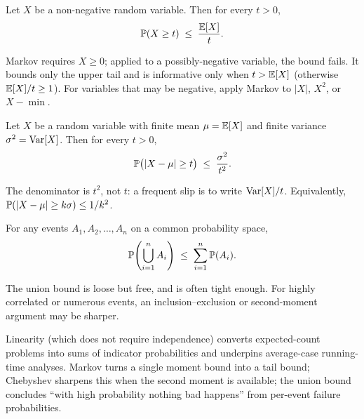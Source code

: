 \begin{theorem}
\label{thm:markov}
Let $X$ be a non-negative random variable. Then for every $t > 0$,
\[
  \operatorname{\mathbb{P}}(X \ge t) \;\le\; \frac{\operatorname{\mathbb{E}}[X]}{t}.
\]
\end{theorem}

\begin{remark}
Markov requires $X \ge 0$; applied to a possibly-negative variable, the bound fails. It bounds only the upper tail and is informative only when $t > \operatorname{\mathbb{E}}[X]$ (otherwise $\operatorname{\mathbb{E}}[X]/t \ge 1$). For variables that may be negative, apply Markov to $|X|$, $X^2$, or $X - \min$.
\end{remark}

\begin{theorem}
\label{thm:chebyshev}
Let $X$ be a random variable with finite mean $\mu = \operatorname{\mathbb{E}}[X]$ and finite variance $\sigma^2 = \operatorname{Var}[X]$. Then for every $t > 0$,
\[
  \operatorname{\mathbb{P}}\bigl(|X - \mu| \ge t\bigr) \;\le\; \frac{\sigma^2}{t^2}.
\]
\end{theorem}

\begin{remark}
The denominator is $t^2$, not $t$: a frequent slip is to write $\operatorname{Var}[X]/t$. Equivalently, $\operatorname{\mathbb{P}}(|X - \mu| \ge k\sigma) \le 1/k^2$.
\end{remark}

\begin{theorem}
\label{thm:union_bound}
For any events $A_1, A_2, \dots, A_n$ on a common probability space,
\[
  \operatorname{\mathbb{P}}\!\left(\bigcup_{i=1}^n A_i\right) \;\le\; \sum_{i=1}^n \operatorname{\mathbb{P}}(A_i).
\]
\end{theorem}

\begin{remark}
The union bound is loose but free, and is often tight enough. For highly correlated or numerous events, an inclusion--exclusion or second-moment argument may be sharper.
\end{remark}

\begin{remark}
Linearity (which does not require independence) converts expected-count problems into sums of indicator probabilities and underpins average-case running-time analyses. Markov turns a single moment bound into a tail bound; Chebyshev sharpens this when the second moment is available; the union bound concludes ``with high probability nothing bad happens'' from per-event failure probabilities.
\end{remark}


